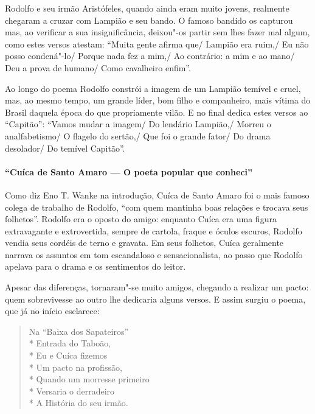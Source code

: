 Rodolfo e seu irmão Aristófeles, quando ainda eram muito jovens,
realmente chegaram a cruzar com Lampião e seu bando. O famoso bandido
os capturou mas, ao verificar a sua insignificância, deixou"-os partir
sem lhes fazer mal algum, como estes versos atestam: “Muita gente
afirma que/ Lampião era ruim,/ Eu não posso condená"-lo/ Porque nada fez
a mim,/ Ao contrário: a mim e ao mano/ Deu a prova de humano/ Como
cavalheiro enfim”.

Ao longo do poema Rodolfo constrói a imagem de um Lampião temível e
cruel, mas, ao mesmo tempo, um grande líder, bom filho e companheiro,
mais vítima do Brasil daquela época do que propriamente vilão. E no
final dedica estes versos ao “Capitão”: “Vamos mudar a imagem/ Do
lendário Lampião,/ Morreu o analfabetismo/ O flagelo do sertão,/ Que
foi o grande fator/ Do drama desolador/ Do temível Capitão”.

\paragraph{“Cuíca de Santo Amaro — O poeta popular que conheci”}

Como diz Eno T. Wanke na introdução, Cuíca de Santo Amaro foi o mais
famoso colega de trabalho de Rodolfo, “com quem mantinha boas relações
e trocava seus folhetos”. Rodolfo era o oposto do amigo: enquanto Cuíca
era uma figura extravagante e extrovertida, sempre de cartola, fraque e
óculos escuros, Rodolfo vendia seus cordéis de terno e gravata. Em seus
folhetos, Cuíca geralmente narrava os assuntos em tom escandaloso e
sensacionalista, ao passo que Rodolfo apelava para o drama e os
sentimentos do leitor.

Apesar das diferenças, tornaram"-se muito amigos, chegando a realizar um
pacto: quem sobrevivesse ao outro lhe dedicaria alguns versos. E assim
surgiu o poema, que já no início esclarece:


\begin{verse}

Na “Baixa dos Sapateiros”\\*
Entrada do Taboão,\\*
Eu e Cuíca fizemos\\*
Um pacto na profissão,\\*
Quando um morresse primeiro\\*
Versaria o derradeiro\\*
A História do seu irmão.

\end{verse}

